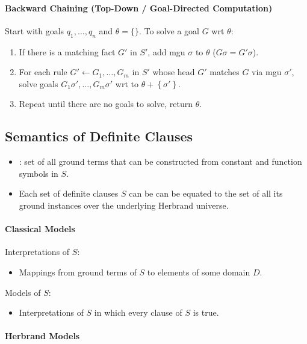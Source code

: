 \documentclass[twocolumn,english]{article}
\let\emph\relax
\begin{document}
\paragraph{Backward Chaining (Top-Down / Goal-Directed Computation)}

Start with goals $q_{1},\dots,q_{n}$ and $\theta=\{\}$. To solve
a goal $G$ wrt $\theta$: 
\begin{enumerate}
\item If there is a matching fact $G'$ in $S'$, add mgu $\sigma$ to $\theta$
($G\sigma=G'\sigma$). 
\item For each rule $G'\leftarrow G_{1},\dots,G_{m}$ in $S'$ whose head
$G'$ matches $G$ via mgu $\sigma'$, solve goals $G_{1}\sigma',\dots,G_{m}\sigma'$
wrt to $\theta+\left\{ \sigma'\right\} $. 
\item Repeat until there are no goals to solve, return $\theta$. 
\end{enumerate}

\subsection{Semantics of Definite Clauses}
\begin{itemize}
\item \emph{Herbrand universe}: set of all ground terms that can be constructed
from constant and function symbols in $S$. 
\item Each set of definite clauses $S$ can be can be equated to the set
of all its ground instances over the underlying Herbrand universe. 
\end{itemize}

\paragraph{Classical Models}

Interpretations of $S$: 
\begin{itemize}
\item Mappings from ground terms of $S$ to elements of some domain $D$. 
\end{itemize}
Models of $S$: 
\begin{itemize}
\item Interpretations of $S$ in which every clause of $S$ is true. 
\end{itemize}

\paragraph{Herbrand Models}
\end{document}
